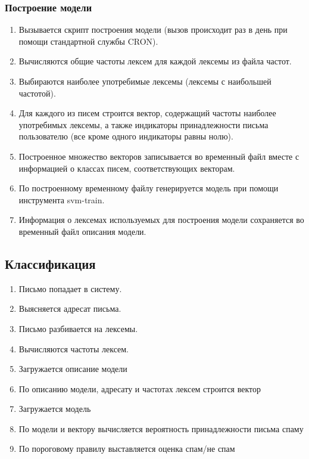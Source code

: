 \subsubsection{Построение модели}
\begin{enumerate}
    \item Вызывается скрипт построения модели (вызов происходит раз в день при помощи стандартной службы CRON).
    \item Вычисляются общие частоты лексем для каждой лексемы из файла частот.
    \item Выбираются наиболее употребимые лексемы (лексемы с наибольшей частотой).
    \item Для каждого из писем строится вектор, содержащий частоты наиболее употребимых лексемы, а также индикаторы принадлежности письма пользователю (все кроме одного индикаторы равны нолю).
    \item Построенное множество векторов записывается во временный файл вместе с информацией о классах писем,  соответствующих векторам.
    \item По построенному временному файлу генерируется модель при помощи инструмента svm-train.
    \item Информация о лексемах используемых для построения модели сохраняется во временный файл описания модели.
\end{enumerate}

\subsection{Классификация}
\begin{enumerate}
    \item Письмо попадает в систему.
    \item Выясняется адресат письма.
    \item Письмо разбивается на лексемы.
    \item Вычисляются частоты лексем.
    \item Загружается описание модели
    \item По описанию модели, адресату и частотах лексем строится вектор
    \item Загружается модель
    \item По модели и вектору вычисляется вероятность принадлежности письма спаму
    \item По пороговому правилу выставляется оценка спам/не спам
\end{enumerate}

